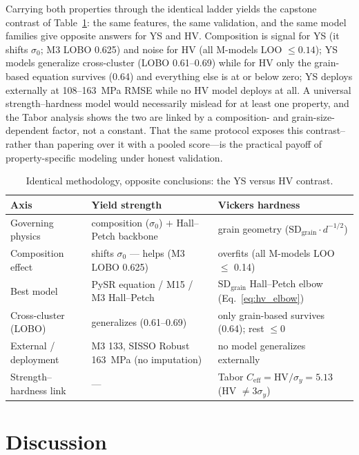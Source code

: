 \documentclass[5p,times,twocolumn]{elsarticle}
\begin{document}
Carrying both properties through the identical ladder yields the capstone contrast of Table~\ref{tab:contrast}: the same features, the same validation, and the same model families give opposite answers for YS and HV. Composition is signal for YS (it shifts $\sigma_0$; M3 LOBO 0.625) and noise for HV (all M-models LOO $\leq 0.14$); YS models generalize cross-cluster (LOBO 0.61--0.69) while for HV only the grain-based equation survives (0.64) and everything else is at or below zero; YS deploys externally at 108--163~\si{MPa} RMSE while no HV model deploys at all. A universal strength--hardness model would necessarily mislead for at least one property, and the Tabor analysis shows the two are linked by a composition- and grain-size-dependent factor, not a constant. That the same protocol exposes this contrast--rather than papering over it with a pooled score---is the practical payoff of property-specific modeling under honest validation.

\begin{table}[t]
\centering
\caption{Identical methodology, opposite conclusions: the YS versus HV contrast.}
\label{tab:contrast}
\small
\setlength{\tabcolsep}{5pt}
\begin{tabular}{@{}lll@{}}
\toprule
Axis & Yield strength & Vickers hardness \\
\midrule
Governing physics & composition ($\sigma_0$) $+$ Hall--Petch backbone & grain geometry ($\text{SD}_\text{grain}\cdot d^{-1/2}$) \\
Composition effect & shifts $\sigma_0$ --- helps (M3 LOBO 0.625) & overfits (all M-models LOO $\leq$ 0.14) \\
Best model & PySR equation / M15 / M3 Hall--Petch & $\text{SD}_\text{grain}$ Hall--Petch elbow (Eq.~\ref{eq:hv_elbow}) \\
Cross-cluster (LOBO) & generalizes (0.61--0.69) & only grain-based survives (0.64); rest $\leq 0$ \\
External / deployment & M3 133, SISSO Robust 163~\si{MPa} (no imputation) & no model generalizes externally \\
Strength--hardness link & --- & Tabor $C_\text{eff} = \text{HV}/\sigma_y = 5.13$ (HV $\neq 3\sigma_y$) \\
\bottomrule
\end{tabular}
\end{table}



\section{Discussion}
\label{sec:discussion}
\end{document}
